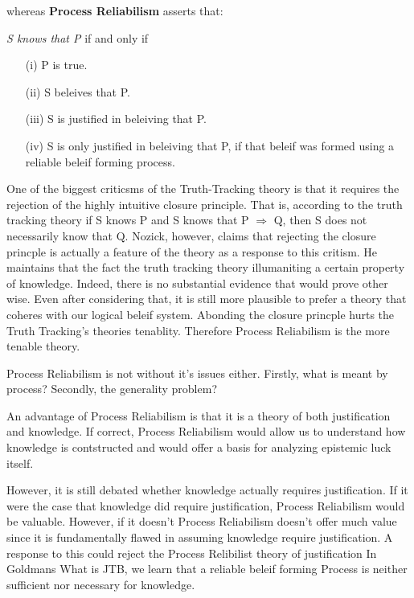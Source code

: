 \documentclass{article}
\begin{document}
whereas \textbf{Process Reliabilism} asserts that:
\begin{displayquote}
  \textit{S knows that P} if and only if
  \begin{enumerate}
      \item[(i)] P is true.
      \item[(ii)] S beleives that P.
      \item[(iii)] S is justified in beleiving that P.
      \item[(iv)] S is only justified in beleiving that P, if that beleif
      was formed using a reliable beleif forming process.
  \end{enumerate}
\end{displayquote}

One of the biggest criticsms of the Truth-Tracking theory is that it requires
the rejection of the highly intuitive closure principle. That is, according
to the truth tracking theory if S knows P and S  knows that  P $\Rightarrow$ Q,
then S does not necessarily know that Q. Nozick, however, claims that rejecting
the closure princple is actually a feature of the theory as a response to this
critism. He maintains that the fact the truth tracking theory illumaniting a
certain property of knowledge. Indeed, there is no substantial evidence that would
prove other wise. Even after considering that, it is still more plausible
to prefer a theory that coheres with our logical beleif system. Abonding the
closure princple hurts the Truth Tracking's theories tenablity. Therefore
Process Reliabilism is the more tenable theory.


Process Reliabilism is not without it's issues either.
Firstly, what is meant by process?
Secondly, the generality problem?

An advantage of Process Reliabilism is that it is a theory of both
justification and knowledge. If correct, Process Reliabilism would
allow us to understand how knowledge is contstructed and would
offer a basis for analyzing epistemic luck itself. %

However, it is still debated whether knowledge actually requires justification.
If it were the case that knowledge did require justification, Process Reliabilism
would be valuable. However, if it doesn't Process Reliabilism doesn't offer much
value since it is fundamentally flawed in assuming knowledge require justification.
A response to this could reject the Process Relibilist theory of justification
In Goldmans What is JTB, we learn that a reliable beleif forming Process
is neither sufficient nor necessary for knowledge.


\end{document}

